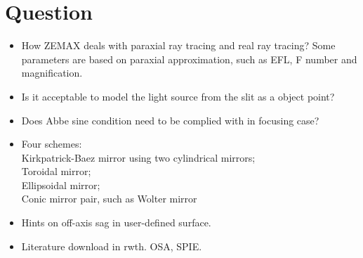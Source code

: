 \documentclass[../main.tex]{subfiles}
\begin{document}
	\section{Question}
	\begin{itemize}  
	\item How ZEMAX deals with paraxial ray tracing and real ray tracing? Some parameters are based on paraxial approximation, such as EFL, F number and magnification.
	\item Is it acceptable to model the light source from the slit as a object point?
	\item Does Abbe sine condition need to be complied with in focusing case?
	\item Four schemes: \\
	Kirkpatrick-Baez mirror using two cylindrical mirrors;\\
	Toroidal mirror;\\
	Ellipsoidal mirror;\\
	Conic mirror pair, such as Wolter mirror
	\item Hints on off-axis sag in user-defined surface.
	\item Literature download in rwth. OSA, SPIE.
	\end{itemize}
\end{document}
